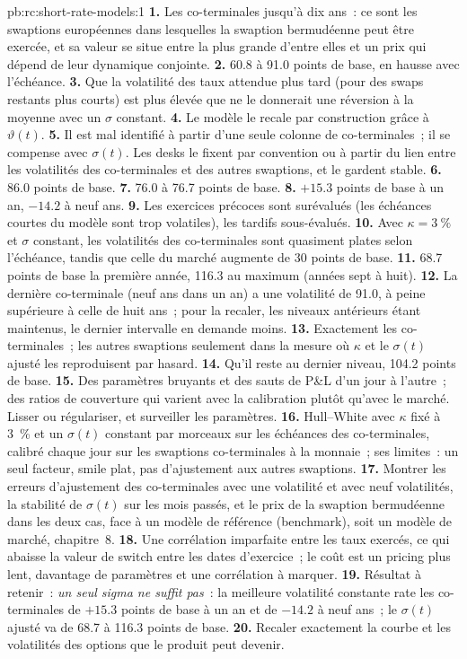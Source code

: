 \begin{solution}{pb:rc:short-rate-models:1}
\textbf{1.} Les co-terminales jusqu'à dix ans~: ce sont les swaptions européennes dans lesquelles la
swaption bermudéenne peut être exercée, et sa valeur se situe entre la plus grande d'entre elles et un prix
qui dépend de leur dynamique conjointe.
\textbf{2.} 60.8 à 91.0 points de base, en hausse avec l'échéance.
\textbf{3.} Que la volatilité des taux attendue plus tard (pour des swaps restants plus courts) est
plus élevée que ne le donnerait une réversion à la moyenne avec un $\sigma$ constant.
\textbf{4.} Le modèle le recale par construction grâce à $\vartheta(t)$.
\textbf{5.} Il est mal identifié à partir d'une seule colonne de co-terminales~; il se compense
avec $\sigma(t)$. Les desks le fixent par convention ou à partir du lien entre
les volatilités des co-terminales et des autres swaptions, et le gardent stable.
\textbf{6.} 86.0 points de base.
\textbf{7.} 76.0 à 76.7 points de base.
\textbf{8.} $+15.3$ points de base à un an, $-14.2$ à neuf ans.
\textbf{9.} Les exercices précoces sont surévalués (les échéances courtes du modèle sont trop
volatiles), les tardifs sous-évalués.
\textbf{10.} Avec $\kappa=3~\%$ et $\sigma$ constant, les volatilités des co-terminales sont quasiment plates selon
l'échéance, tandis que celle du marché augmente de 30 points de base.
\textbf{11.} 68.7 points de base la première année, 116.3 au maximum (années sept
à huit).
\textbf{12.} La dernière co-terminale (neuf ans dans un an) a une volatilité de 91.0, à peine
supérieure à celle de huit ans~; pour la recaler, les niveaux antérieurs étant
maintenus, le dernier intervalle en demande moins.
\textbf{13.} Exactement les co-terminales~; les autres swaptions seulement dans la mesure où
$\kappa$ et le $\sigma(t)$ ajusté les reproduisent par hasard.
\textbf{14.} Qu'il reste au dernier niveau, 104.2 points de base.
\textbf{15.} Des paramètres bruyants et des sauts de P\&L d'un jour à l'autre~; des ratios de
couverture qui varient avec la calibration plutôt qu'avec le marché. Lisser ou régulariser, et
surveiller les paramètres.
\textbf{16.} Hull--White avec $\kappa$ fixé à 3~\% et un $\sigma(t)$ constant par morceaux sur les
échéances des co-terminales, calibré chaque jour sur les swaptions co-terminales à la monnaie~;
ses limites~: un seul facteur, smile plat, pas d'ajustement aux autres swaptions.
\textbf{17.} Montrer les erreurs d'ajustement des co-terminales avec une volatilité et avec neuf volatilités, la
stabilité de $\sigma(t)$ sur les mois passés, et le prix de la swaption bermudéenne dans les deux cas,
face à un modèle de référence (benchmark), soit un modèle de marché, chapitre~8.
\textbf{18.} Une corrélation imparfaite entre les taux exercés, ce qui abaisse la
valeur de switch entre les dates d'exercice~; le coût est un pricing plus lent, davantage de
paramètres et une corrélation à marquer.
\textbf{19.} Résultat à retenir~: \emph{un seul sigma ne suffit pas}~: la meilleure volatilité constante
rate les co-terminales de $+15.3$ points de base à un an et de $-14.2$ à neuf ans~;
le $\sigma(t)$ ajusté va de 68.7 à 116.3 points de base.
\textbf{20.} Recaler exactement la courbe et les volatilités des options que le produit
peut devenir.
\end{solution}

